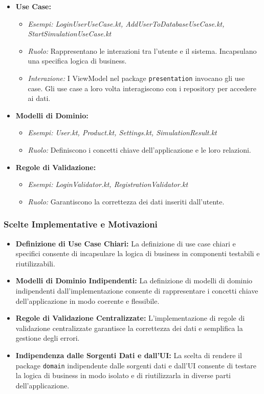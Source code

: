 \documentclass{article}
\begin{document}
\begin{itemize}
    \item \textbf{Use Case:}
    \begin{itemize}
        \item \textit{Esempi: LoginUserUseCase.kt, AddUserToDatabaseUseCase.kt, StartSimulationUseCase.kt}
        \item \textit{Ruolo:} Rappresentano le interazioni tra l'utente e il sistema. Incapsulano una specifica logica di business.
        \item \textit{Interazione:} I ViewModel nel package \texttt{presentation} invocano gli use case. Gli use case a loro volta interagiscono con i repository per accedere ai dati.
    \end{itemize}
    \item \textbf{Modelli di Dominio:}
    \begin{itemize}
        \item \textit{Esempi: User.kt, Product.kt, Settings.kt, SimulationResult.kt}
        \item \textit{Ruolo:} Definiscono i concetti chiave dell'applicazione e le loro relazioni.
    \end{itemize}
    \item \textbf{Regole di Validazione:}
    \begin{itemize}
        \item \textit{Esempi: LoginValidator.kt, RegistrationValidator.kt}
        \item \textit{Ruolo:} Garantiscono la correttezza dei dati inseriti dall'utente.
    \end{itemize}
\end{itemize}

\subsubsection{Scelte Implementative e Motivazioni}

\begin{itemize}
    \item \textbf{Definizione di Use Case Chiari:} La definizione di use case chiari e specifici consente di incapsulare la logica di business in componenti testabili e riutilizzabili.
    \item \textbf{Modelli di Dominio Indipendenti:} La definizione di modelli di dominio indipendenti dall'implementazione consente di rappresentare i concetti chiave dell'applicazione in modo coerente e flessibile.
    \item \textbf{Regole di Validazione Centralizzate:} L'implementazione di regole di validazione centralizzate garantisce la correttezza dei dati e semplifica la gestione degli errori.
    \item \textbf{Indipendenza dalle Sorgenti Dati e dall'UI:} La scelta di rendere il package \texttt{domain} indipendente dalle sorgenti dati e dall'UI consente di testare la logica di business in modo isolato e di riutilizzarla in diverse parti dell'applicazione.
\end{itemize}
\end{document}

